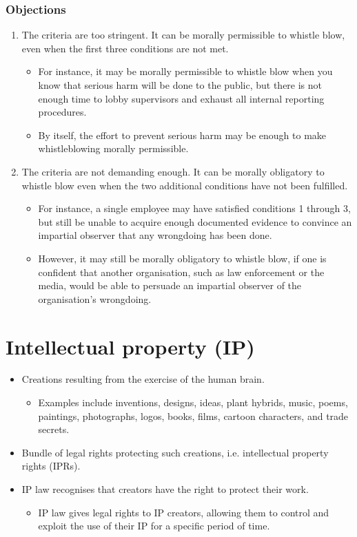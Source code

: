 \documentclass[11pt]{article}
\begin{document}
\subsubsection{Objections}
\label{sec:org496d446}
\begin{enumerate}
\item The criteria are too stringent. It can be morally permissible to whistle blow, even when the first three conditions are not met.
\begin{itemize}
\item For instance, it may be morally permissible to whistle blow when you know that serious harm will be done to the public, but there is not enough time to lobby supervisors and exhaust all internal reporting procedures.
\item By itself, the effort to prevent serious harm may be enough to make whistleblowing morally permissible.
\end{itemize}

\item The criteria are not demanding enough. It can be morally obligatory to whistle blow even when the two additional conditions have not been fulfilled.
\begin{itemize}
\item For instance, a single employee may have satisfied conditions 1 through 3, but still be unable to acquire enough documented evidence to convince an impartial observer that any wrongdoing has been done.
\item However, it may still be morally obligatory to whistle blow, if one is confident that another organisation, such as law enforcement or the media, would be able to persuade an impartial observer of the organisation's wrongdoing.
\end{itemize}
\end{enumerate}
\section{Intellectual property (IP)}
\label{sec:org4d30dc4}
\begin{itemize}
\item Creations resulting from the exercise of the human brain.
\begin{itemize}
\item Examples include inventions, designs, ideas, plant hybrids, music, poems, paintings, photographs, logos, books, films, cartoon characters, and trade secrets.
\end{itemize}

\item Bundle of legal rights protecting such creations, i.e. intellectual property rights (IPRs).
\item IP law recognises that creators have the right to protect their work.
\begin{itemize}
\item IP law gives legal rights to IP creators, allowing them to control and exploit the use of their IP for a specific period of time.
\end{itemize}
\end{itemize}
\end{document}
